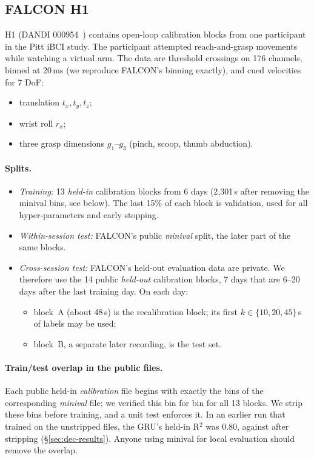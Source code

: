 \subsection{FALCON H1}
H1 (DANDI 000954~\cite{ye2024falconh1data}) contains open-loop calibration blocks from
one participant in the Pitt iBCI study. The participant attempted reach-and-grasp
movements while watching a virtual arm. The data are threshold crossings on 176
channels, binned at 20\,ms (we reproduce FALCON's binning exactly), and cued velocities
for 7 DoF:
\begin{itemize}
\item translation $t_x,t_y,t_z$;
\item wrist roll $r_x$;
\item three grasp dimensions $g_1$--$g_3$ (pinch, scoop, thumb abduction).
\end{itemize}

\paragraph{Splits.}
\begin{itemize}
\item \emph{Training:} 13 \emph{held-in} calibration blocks from 6 days (2{,}301\,s after removing the minival bins, see below). The
  last 15\% of each block is validation, used for all hyper-parameters and early stopping.
\item \emph{Within-session test:} FALCON's public \emph{minival} split, the later part of
  the same blocks.
\item \emph{Cross-session test:} FALCON's held-out evaluation data are private. We
  therefore use the 14 public \emph{held-out} calibration blocks, 7 days that are 6--20
  days after the last training day. On each day:
  \begin{itemize}
  \item block~A (about 48\,s) is the recalibration block; its first $k\in\{10,20,45\}$\,s
    of labels may be used;
  \item block~B, a separate later recording, is the test set.
  \end{itemize}
\end{itemize}

\paragraph{Train/test overlap in the public files.} Each public held-in \emph{calibration} file begins with exactly the bins of the corresponding \emph{minival} file; we verified this bin for bin for all 13 blocks. We strip these bins before training, and a unit test enforces it. In an earlier run that trained on the unstripped files, the GRU's held-in R$^2$ was 0.80, against \GRUWithin{} after stripping (\S\ref{sec:dec-results}). Anyone using minival for local evaluation should remove the overlap.

